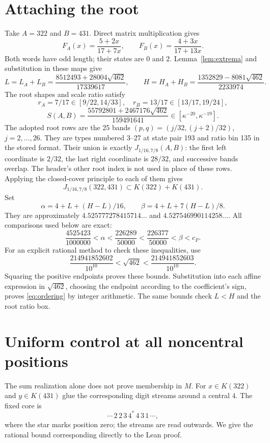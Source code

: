 \documentclass[11pt,a4paper]{article}
\newcommand{\dd}{\sqrt{462}}
\begin{document}
\section{Attaching the root}
Take $A=322$ and $B=431$. Direct matrix multiplication gives
\[
 F_A(x)=\frac{5+2x}{17+7x},\qquad F_B(x)=\frac{4+3x}{17+13x}.
\]
Both words have odd length; their states are $0$ and $2$.
Lemma~\ref{lem:extrema} and substitution in these maps give
\[
 L=L_A+L_B=\frac{8512493+28004\dd}{17339617},\qquad
 H=H_A+H_B=\frac{1352829-8081\dd}{2233974}.
\]
The root shapes and scale ratio satisfy
\[
 r_A=7/17\in[9/22,14/33],\quad
 r_B=13/17\in[13/17,19/24],
\]
\[
 S(A,B)=\frac{55792801+2467176\dd}{159491641}
 \in[\kappa^{-20},\kappa^{-19}].
\]
The adopted root rows are the 25 bands
$(p,q)=(j/32,(j+2)/32)$, $j=2,\ldots,26$.
They are types numbered 3--27 at state pair 193 and ratio bin 135
in the stored format. Their union is exactly $J_{1/16,7/8}(A,B)$:
the first left coordinate is $2/32$, the last right coordinate is
$28/32$, and successive bands overlap. The header's other root index
is not used in place of these rows.
Applying the closed-cover principle to each of them gives
\begin{equation}\label{eq:sum}
 J_{1/16,7/8}(322,431)\subset K(322)+K(431).
\end{equation}
Set
\[
 \alpha=4+L+(H-L)/16,\qquad \beta=4+L+7(H-L)/8.
\]
They are approximately $4.525777278415714\ldots$ and
$4.527546990114258\ldots$. All comparisons used below are exact:
\begin{equation}\label{eq:ordering}
 \frac{4525423}{1000000}<\alpha<\frac{226289}{50000}
 <\frac{226377}{50000}<\beta<c_F.
\end{equation}
For an explicit rational method to check these inequalities, use
\[
 \frac{214941852602}{10^{10}}<\sqrt{462}
 <\frac{214941852603}{10^{10}}.
\]
Squaring the positive endpoints proves these bounds. Substitution into
each affine expression in $\sqrt{462}$, choosing the endpoint according
to the coefficient's sign, proves \eqref{eq:ordering} by integer
arithmetic. The same bounds check $L<H$ and the root ratio box.

\section{Uniform control at all noncentral positions}\label{sec:spectral}
The sum realization alone does not prove membership in $M$.
For $x\in K(322)$ and $y\in K(431)$ glue the corresponding digit
streams around a central $4$. The fixed core is
\[
 \cdots\,2\,2\,3\,4^*\,4\,3\,1\,\cdots,
\]
where the star marks position zero; the streams are read outwards.
We give the rational bound corresponding directly to the Lean proof.
\end{document}
